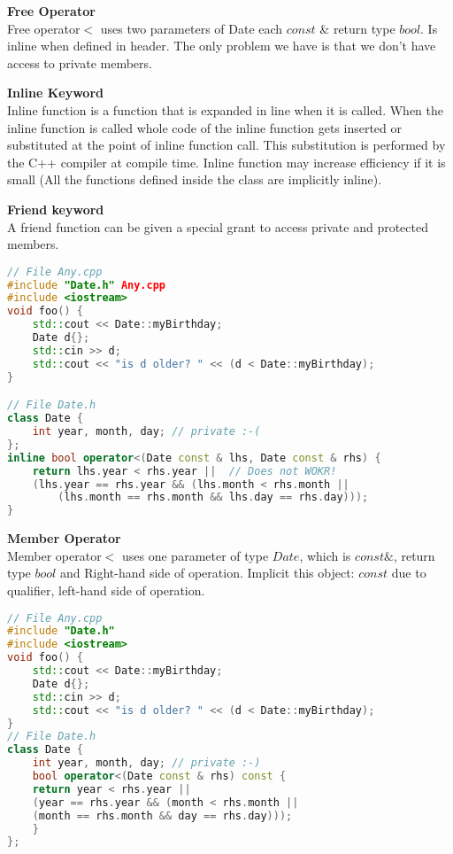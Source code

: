 \textbf{Free Operator} \\
Free operator$<$ uses two parameters of Date each $const$ \& return type $bool$. Is inline when defined in header. The only problem we have is that we don't have access to private members.

\textbf{Inline Keyword} \\
Inline function is a function that is expanded in line when it is called. When the inline function is called whole code of the inline function gets inserted or substituted at the point of inline function call. This substitution is performed by the C++ compiler at compile time. Inline function may increase efficiency if it is small (All the functions defined inside the class are implicitly inline).

\textbf{Friend keyword} \\
A friend function can be given a special grant to access private and protected members.

\begin{lstlisting}[language=C++]
// File Any.cpp
#include "Date.h" Any.cpp
#include <iostream>
void foo() {
	std::cout << Date::myBirthday;
	Date d{};
	std::cin >> d;
	std::cout << "is d older? " << (d < Date::myBirthday); 
}

// File Date.h
class Date {
	int year, month, day; // private :-( 
};
inline bool operator<(Date const & lhs, Date const & rhs) {
	return lhs.year < rhs.year ||  // Does not WOKR!
	(lhs.year == rhs.year && (lhs.month < rhs.month ||
		(lhs.month == rhs.month && lhs.day == rhs.day)));
}
\end{lstlisting}

\textbf{Member Operator} \\
Member operator$<$ uses one parameter of type $Date$, which is $const \&$, return type $bool$ and Right-hand side of operation. Implicit this object: $const$ due to qualifier, left-hand side of operation.
\begin{lstlisting}[language=C++]
// File Any.cpp
#include "Date.h" 
#include <iostream>
void foo() {
	std::cout << Date::myBirthday;
	Date d{};
	std::cin >> d;
	std::cout << "is d older? " << (d < Date::myBirthday); 
}
// File Date.h
class Date {
	int year, month, day; // private :-)
	bool operator<(Date const & rhs) const {
	return year < rhs.year ||
	(year == rhs.year && (month < rhs.month ||
	(month == rhs.month && day == rhs.day)));
	} 
};
\end{lstlisting}


\break







